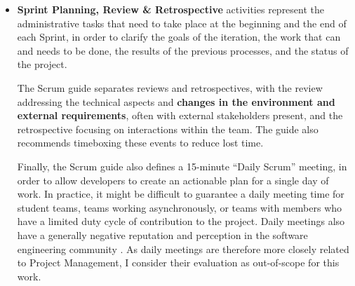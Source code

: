 \documentclass[a4paper,nobib,justified,final]{tufte-book}
\begin{document}
\begin{itemize}[itemsep=-1ex]
	The duration of this phase can be long, depending on the complexity of testing, the need for external 
	facilities, and the amount of non-conformances discovered. A common guideline is to allocate 50\% of a project's development time into testing activities \autocite{venturiniImprovingMissionSuccess2017}.
	Experience from past projects has shown that testing time is often underestimated. It is therefore important for developers to account the duration of this phase, adding appropriate margins.

	\item \textbf{Sprint Planning, Review \& Retrospective} activities represent the administrative tasks that need to take place at the beginning and the end of each Sprint, in order to clarify the goals of the iteration, the work that can and needs to be done, the results of the previous processes, and the status of the project.
	
	The Scrum guide separates reviews and retrospectives, with the review addressing the technical aspects and \textbf{changes in the environment and external requirements}, often with external stakeholders present, and the retrospective focusing on interactions within the team. The guide also recommends timeboxing these events to reduce lost time.

	Finally, the Scrum guide also defines a 15-minute ``Daily Scrum'' meeting, in order to allow developers to create an actionable plan for a single day of work. In practice, it might be difficult to guarantee a daily meeting time for student teams, teams working asynchronously, or teams with members who have a limited duty cycle of contribution to the project. Daily meetings also have a generally negative reputation and perception in the software engineering community \autocite{singhExploringLivedExperiences2023,cooperAgileDevelopmentManufacturing2023}. As daily meetings are therefore more closely related to Project Management, I consider their evaluation as out-of-scope for this work.
\end{itemize}
\end{document}

